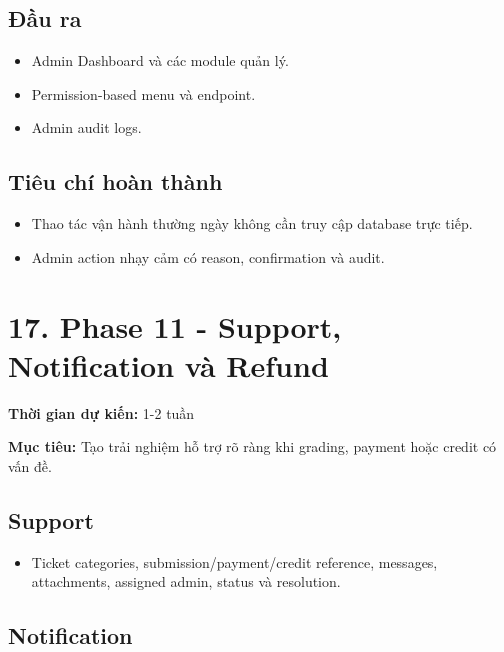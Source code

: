 \documentclass[
  11pt,
  a4paper,
]{article}
\begin{document}
\subsection{Đầu ra}\label{ux111ux1ea7u-ra-10}

\begin{itemize}
\item
  Admin Dashboard và các module quản lý.
\item
  Permission-based menu và endpoint.
\item
  Admin audit logs.
\end{itemize}

\subsection{Tiêu chí hoàn
thành}\label{tiuxeau-chuxed-houxe0n-thuxe0nh-10}

\begin{itemize}
\item
  Thao tác vận hành thường ngày không cần truy cập database trực tiếp.
\item
  Admin action nhạy cảm có reason, confirmation và audit.
\end{itemize}

\section{17. Phase 11 - Support, Notification và
Refund}\label{phase-11---support-notification-vuxe0-refund}

\textbf{Thời gian dự kiến:} 1-2 tuần

\textbf{Mục tiêu:} Tạo trải nghiệm hỗ trợ rõ ràng khi grading, payment
hoặc credit có vấn đề.

\subsection{Support}\label{support}

\begin{itemize}
\item
  Ticket categories, submission/payment/credit reference, messages,
  attachments, assigned admin, status và resolution.
\end{itemize}

\subsection{Notification}\label{notification}
\end{document}
